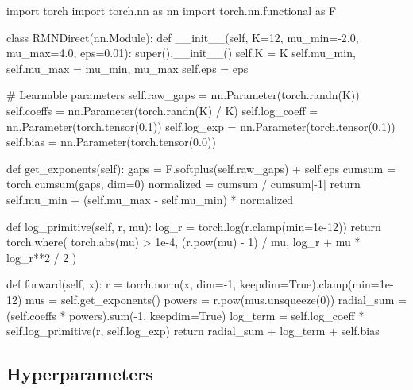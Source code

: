 \documentclass[twoside,11pt]{article}
\begin{document}
\begin{pythonlisting}
import torch
import torch.nn as nn
import torch.nn.functional as F

class RMNDirect(nn.Module):
    def __init__(self, K=12, mu_min=-2.0, mu_max=4.0, eps=0.01):
        super().__init__()
        self.K = K
        self.mu_min, self.mu_max = mu_min, mu_max
        self.eps = eps
        
        # Learnable parameters
        self.raw_gaps = nn.Parameter(torch.randn(K))
        self.coeffs = nn.Parameter(torch.randn(K) / K)
        self.log_coeff = nn.Parameter(torch.tensor(0.1))
        self.log_exp = nn.Parameter(torch.tensor(0.1))
        self.bias = nn.Parameter(torch.tensor(0.0))
    
    def get_exponents(self):
        gaps = F.softplus(self.raw_gaps) + self.eps
        cumsum = torch.cumsum(gaps, dim=0)
        normalized = cumsum / cumsum[-1]
        return self.mu_min + (self.mu_max - self.mu_min) * normalized
    
    def log_primitive(self, r, mu):
        log_r = torch.log(r.clamp(min=1e-12))
        return torch.where(
            torch.abs(mu) > 1e-4,
            (r.pow(mu) - 1) / mu,
            log_r + mu * log_r**2 / 2
        )
    
    def forward(self, x):
        r = torch.norm(x, dim=-1, keepdim=True).clamp(min=1e-12)
        mus = self.get_exponents()
        powers = r.pow(mus.unsqueeze(0))
        radial_sum = (self.coeffs * powers).sum(-1, keepdim=True)
        log_term = self.log_coeff * self.log_primitive(r, self.log_exp)
        return radial_sum + log_term + self.bias
\end{pythonlisting}

\subsection{Hyperparameters}
\end{document}
